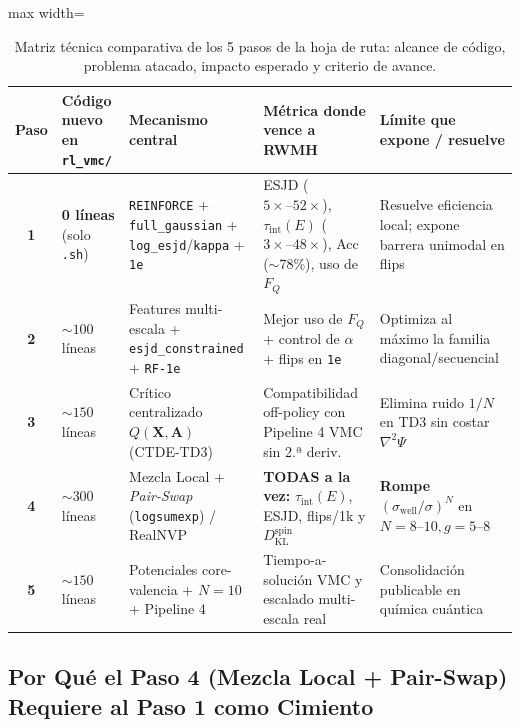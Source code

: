 \documentclass[10pt,a4paper]{article}
\begin{document}
\begin{table}[H]
\centering
\caption{Matriz técnica comparativa de los 5 pasos de la hoja de ruta: alcance de código, problema atacado, impacto esperado y criterio de avance.}
\label{tab:roadmap}
\begin{adjustbox}{max width=\textwidth}
\begin{tabular}{cllll}
\toprule
\textbf{Paso} & \textbf{Código nuevo en \texttt{rl\_vmc/}} & \textbf{Mecanismo central} & \textbf{Métrica donde vence a RWMH} & \textbf{Límite que expone / resuelve} \\
\midrule
\textbf{1} & \textbf{0 líneas} (solo \texttt{.sh}) & \texttt{REINFORCE} + \texttt{full\_gaussian} + \texttt{log\_esjd}/\texttt{kappa} + \texttt{1e} & ESJD ($5\times\text{--}52\times$), $\tau_{\mathrm{int}}(E)$ ($3\times\text{--}48\times$), Acc ($\sim 78\%$), uso de $F_Q$ & Resuelve eficiencia local; expone barrera unimodal en flips \\
\textbf{2} & $\sim 100$ líneas & Features multi-escala + \texttt{esjd\_constrained} + \texttt{RF-1e} & Mejor uso de $F_Q$ + control de $\alpha$ + flips en \texttt{1e} & Optimiza al máximo la familia diagonal/secuencial \\
\textbf{3} & $\sim 150$ líneas & Crítico centralizado $Q(\bm{X},\bm{A})$ (CTDE-TD3) & Compatibilidad off-policy con Pipeline 4 VMC sin 2.ª deriv. & Elimina ruido $1/N$ en TD3 sin costar $\nabla^2 \Psi$ \\
\textbf{4} & $\sim 300$ líneas & Mezcla Local + \textit{Pair-Swap} (\texttt{logsumexp}) / RealNVP & \textbf{TODAS a la vez:} $\tau_{\mathrm{int}}(E)$, ESJD, flips/1k y $D_{\mathrm{KL}}^{\mathrm{spin}}$ & \textbf{Rompe $(\sigma_{\mathrm{well}}/\sigma)^N$} en $N=8\text{--}10, g=5\text{--}8$ \\
\textbf{5} & $\sim 150$ líneas & Potenciales core-valencia + $N=10$ + Pipeline 4 & Tiempo-a-solución VMC y escalado multi-escala real & Consolidación publicable en química cuántica \\
\bottomrule
\end{tabular}
\end{adjustbox}
\end{table}

\subsection{Por Qué el Paso 4 (Mezcla Local + Pair-Swap) Requiere al Paso 1 como Cimiento}
\end{document}
